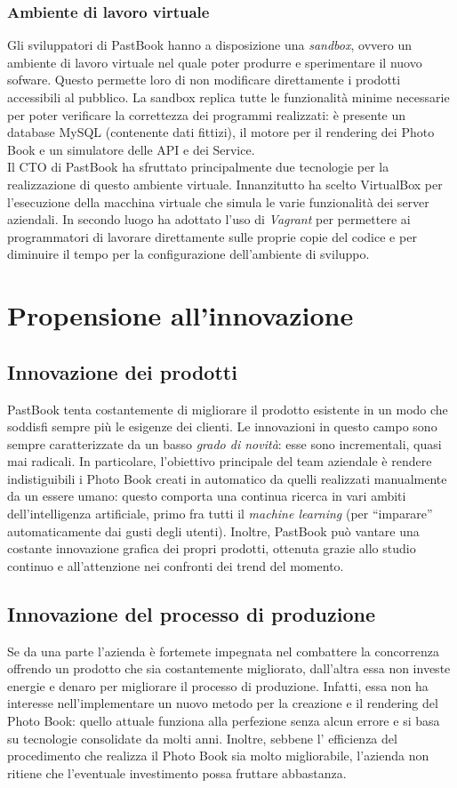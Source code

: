 			\subsubsection{Ambiente di lavoro virtuale}
				Gli sviluppatori di PastBook hanno a disposizione una \emph{sandbox}, ovvero un ambiente di lavoro virtuale nel
				quale poter produrre e sperimentare il nuovo sofware. Questo permette loro di non modificare direttamente i prodotti
				accessibili al pubblico. La sandbox replica tutte le funzionalità minime necessarie per poter verificare la
				correttezza dei programmi realizzati: è presente un database MySQL (contenente dati fittizi), il motore per il
				rendering dei Photo Book e un simulatore delle API e dei Service.\\
				Il CTO di PastBook ha sfruttato principalmente due tecnologie per la realizzazione di questo ambiente virtuale.
				Innanzitutto ha scelto VirtualBox per l'esecuzione della macchina virtuale che simula le varie funzionalità dei
				server aziendali. In secondo luogo ha adottato l'uso di \emph{Vagrant} per permettere ai programmatori di lavorare
				direttamente sulle proprie copie del codice e per diminuire il tempo per la configurazione dell'ambiente di
				sviluppo.
	\section{Propensione all'innovazione}
		\subsection{Innovazione dei prodotti}	
			PastBook tenta costantemente di migliorare il prodotto esistente in un modo che soddisfi sempre più le esigenze dei clienti.
			Le innovazioni in questo campo sono sempre caratterizzate da un basso \emph{grado di novità}: esse sono incrementali, quasi
			mai radicali. In particolare, l'obiettivo principale del team aziendale è rendere indistiguibili i Photo Book
			creati in automatico da quelli realizzati manualmente da un essere umano: questo comporta una continua ricerca in vari
			ambiti dell'intelligenza artificiale, primo fra tutti il \emph{machine learning} (per “imparare” automaticamente dai gusti
			degli utenti). Inoltre, PastBook può vantare una costante innovazione grafica dei propri prodotti, ottenuta grazie allo
			studio continuo e all'attenzione nei confronti dei trend del momento.
		\subsection{Innovazione del processo di produzione}
			Se da una parte l'azienda è fortemete impegnata nel combattere la concorrenza offrendo un prodotto che sia costantemente
			migliorato, dall'altra essa non investe energie e denaro per migliorare il processo di produzione. Infatti, essa non ha
			interesse nell'implementare un nuovo metodo per la creazione e il rendering del Photo Book: quello attuale funziona alla
			perfezione senza alcun errore e si basa su tecnologie consolidate da molti anni. Inoltre, sebbene l' efficienza del
			procedimento che realizza il Photo Book sia molto migliorabile, l'azienda non ritiene che l'eventuale investimento possa
			fruttare abbastanza.
